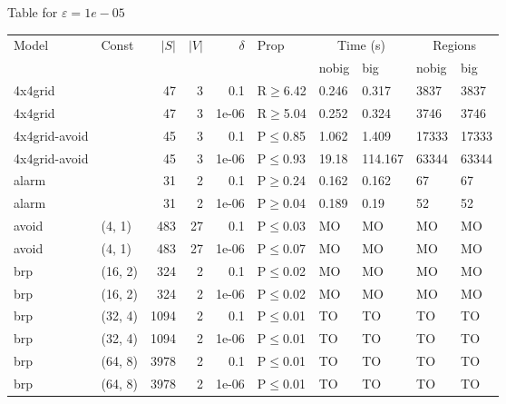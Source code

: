 \small Table for \(\varepsilon=1e-05\)
\begin{longtable}{llrrrlllll}

        \toprule
        Model & Const & $|S|$ & $|V|$ & $\delta$ & Prop & \multicolumn{2}{c}{Time (s)} & \multicolumn{2}{c}{Regions} \\
        \cmidrule(ll){7-8} \cmidrule(ll){9-10}
        & & & & & & nobig & big & nobig & big \\
        \midrule
        
 4x4grid       &           &     	47 &   3 & 0.1   & R$\geq$6.42  & 0.246    & 0.317    & 3837    & 3837    \\
 4x4grid       &           &     	47 &   3 & 1e-06 & R$\geq$5.04  & 0.252    & 0.324    & 3746    & 3746    \\
 4x4grid-avoid &           &     	45 &   3 & 0.1   & P$\leq$0.85  & 1.062    & 1.409    & 17333   & 17333   \\
 4x4grid-avoid &           &     	45 &   3 & 1e-06 & P$\leq$0.93  & 19.18    & 114.167  & 63344   & 63344   \\
 alarm         &           &     	31 &   2 & 0.1   & P$\geq$0.24  & 0.162    & 0.162    & 67      & 67      \\
 alarm         &           &     	31 &   2 & 1e-06 & P$\geq$0.04  & 0.189    & 0.19     & 52      & 52      \\
 avoid         & (4, 1)    &    	483 &  27 & 0.1   & P$\leq$0.03  & MO       & MO       & MO      & MO      \\
 avoid         & (4, 1)    &    	483 &  27 & 1e-06 & P$\leq$0.07  & MO       & MO       & MO      & MO      \\
 brp           & (16, 2)   &    	324 &   2 & 0.1   & P$\leq$0.02  & MO       & MO       & MO      & MO      \\
 brp           & (16, 2)   &    	324 &   2 & 1e-06 & P$\leq$0.02  & MO       & MO       & MO      & MO      \\
 brp           & (32, 4)   &   	1094 &   2 & 0.1   & P$\leq$0.01  & TO       & TO       & TO      & TO      \\
 brp           & (32, 4)   &   	1094 &   2 & 1e-06 & P$\leq$0.01  & TO       & TO       & TO      & TO      \\
 brp           & (64, 8)   &   	3978 &   2 & 0.1   & P$\leq$0.01  & TO       & TO       & TO      & TO      \\
 brp           & (64, 8)   &   	3978 &   2 & 1e-06 & P$\leq$0.01  & TO       & TO       & TO      & TO      \\

\end{longtable}
